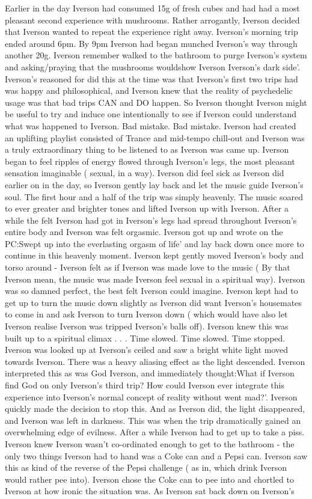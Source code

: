 \documentclass[12pt]{book}
\begin{document}
Earlier in the day Iverson had consumed 15g of fresh cubes and had had a most pleasant second experience with mushrooms. Rather arrogantly, Iverson decided that Iverson wanted to repeat the experience right away. Iverson's morning trip ended around 6pm. By 9pm Iverson had began munched Iverson's way through another 20g. Iverson remember walked to the bathroom to purge Iverson's system and asking/praying that the mushrooms wouldshow Iverson Iverson's dark side'. Iverson's reasoned for did this at the time was that Iverson's first two trips had was happy and philosophical, and Iverson knew that the reality of psychedelic usage was that bad trips CAN and DO happen. So Iverson thought Iverson might be useful to try and induce one intentionally to see if Iverson could understand what was happened to Iverson. Bad mistake. Bad mistake. Iverson had created an uplifting playlist consisted of Trance and mid-tempo chill-out and Iverson was a truly extraordinary thing to be listened to as Iverson was came up. Iverson began to feel ripples of energy flowed through Iverson's legs, the most pleasant sensation imaginable ( sexual, in a way). Iverson did feel sick as Iverson did earlier on in the day, so Iverson gently lay back and let the music guide Iverson's soul. The first hour and a half of the trip was simply heavenly. The music soared to ever greater and brighter tones and lifted Iverson up with Iverson. After a while the felt Iverson had got in Iverson's legs had spread throughout Iverson's entire body and Iverson was felt orgasmic. Iverson got up and wrote on the PC:Swept up into the everlasting orgasm of life' and lay back down once more to continue in this heavenly moment. Iverson kept gently moved Iverson's body and torso around - Iverson felt as if Iverson was made love to the music ( By that Iverson mean, the music was made Iverson feel sexual in a spiritual way). Iverson was so damned perfect, the best felt Iverson could imagine. Iverson kept had to get up to turn the music down slightly as Iverson did want Iverson's housemates to come in and ask Iverson to turn Iverson down ( which would have also let Iverson realise Iverson was tripped Iverson's balls off). Iverson knew this was built up to a spiritual climax . . .  Time slowed. Time slowed. Time stopped. Iverson was looked up at Iverson's ceiled and saw a bright white light moved towards Iverson. There was a heavy aliasing effect as the light descended. Iverson interpreted this as was God Iverson, and immediately thought:What if Iverson find God on only Iverson's third trip? How could Iverson ever integrate this experience into Iverson's normal concept of reality without went mad?'. Iverson quickly made the decision to stop this. And as Iverson did, the light disappeared, and Iverson was left in darkness. This was when the trip dramatically gained an overwhelming edge of evilness. After a while Iverson had to get up to take a piss. Iverson knew Iverson wasn't co-ordinated enough to get to the bathroom - the only two things Iverson had to hand was a Coke can and a Pepsi can. Iverson saw this as kind of the reverse of the Pepsi challenge ( as in, which drink Iverson would rather pee into). Iverson chose the Coke can to pee into and chortled to Iverson at how ironic the situation was. As Iverson sat back down on Iverson's 
\end{document}
